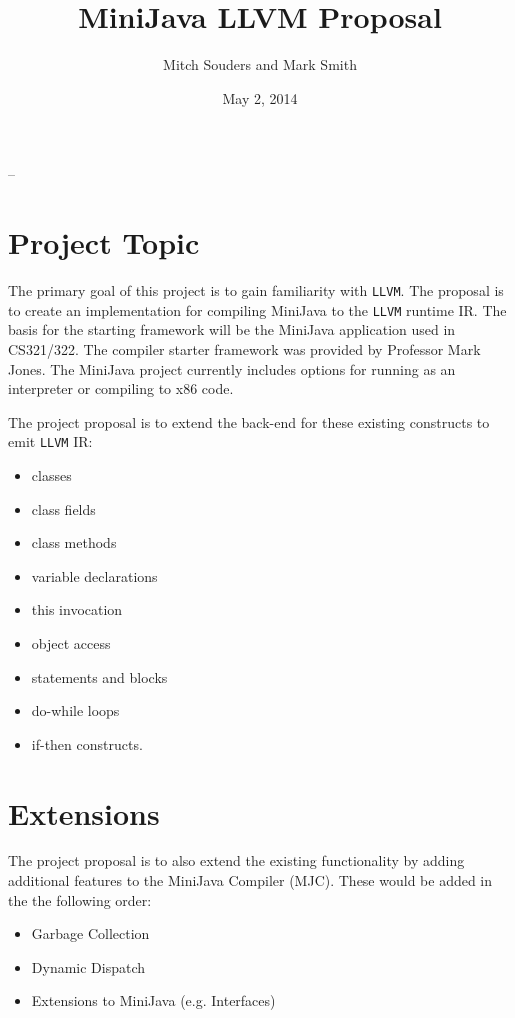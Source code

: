 \documentclass[11pt]{article}
\title{MiniJava LLVM Proposal}
\author{Mitch Souders and Mark Smith}
\date{May 2, 2014}
\begin{document}
\makeatletter
\def\maketitle{\par{\centerline{\huge\bfseries\@title}}\par\@author -- \@date}
\makeatother

\maketitle

\section*{Project Topic}
The primary goal of this project is to gain familiarity with \texttt{LLVM}. The proposal is to create an implementation for compiling MiniJava to the \texttt{LLVM} runtime IR.  The basis for the starting framework will be the MiniJava application used in CS321/322.  The compiler starter framework was provided by Professor Mark Jones.  The MiniJava project currently includes options for running as an interpreter or compiling to x86 code.

The project proposal is to extend the back-end for these existing constructs to emit \texttt{LLVM} IR:

\begin{itemize} 
\item classes
\item class fields
\item class methods
\item variable declarations
\item this invocation
\item object access
\item statements and blocks
\item do-while loops
\item if-then constructs.  
\end{itemize}

\section*{Extensions}
The project proposal is to also extend the existing functionality by adding additional features to the MiniJava Compiler (MJC).  These would be added in the the following order:

\begin{itemize}
\item Garbage Collection
\item Dynamic Dispatch
\item Extensions to MiniJava (e.g. Interfaces)
\end{itemize}
\end{document}
